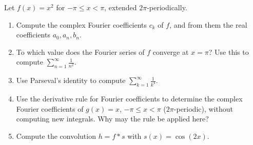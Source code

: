 Let $f(x)=x^2$ for $-\pi\le x<\pi$, extended $2\pi$-periodically.
\begin{enumerate}
\item Compute the complex Fourier coefficients $c_k$ of $f$, and from them the real coefficients $a_0,a_n,b_n$.
\item To which value does the Fourier series of $f$ converge at $x=\pi$? Use this to compute $\sum_{n=1}^\infty\frac1{n^2}$.
\item Use Parseval's identity to compute $\sum_{k=1}^\infty\frac1{k^4}$.
\item Use the derivative rule for Fourier coefficients to determine the complex Fourier coefficients of $g(x)=x$, $-\pi\le x<\pi$ ($2\pi$-periodic), without computing new integrals. Why may the rule be applied here?
\item Compute the convolution $h=f\ast s$ with $s(x)=\cos(2x)$.
\end{enumerate}


